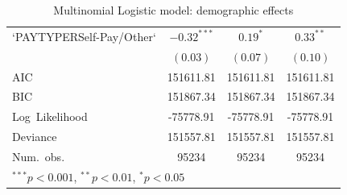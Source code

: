 \documentclass[12pt,twoside]{reedthesis}
\begin{document}
\begin{table}
\begin{center}
\begin{footnotesize}
\begin{tabular}{l c c c }
  `PAYTYPERSelf-Pay/Other` & $\mathbf{-0.32}^{***}$ & $0.19^{*}$             & $0.33^{**}$            \\
                           & $(0.03)$               & $(0.07)$               & $(0.10)$               \\
  \hline
  AIC                      & 151611.81              & 151611.81              & 151611.81              \\
  BIC                      & 151867.34              & 151867.34              & 151867.34              \\
  Log\ Likelihood          & -75778.91              & -75778.91              & -75778.91              \\
  Deviance                 & 151557.81              & 151557.81              & 151557.81              \\
  Num.\ obs.               & 95234                  & 95234                  & 95234                  \\
  \hline
  \multicolumn{4}{l}{\tiny{$^{***}p<0.001$, $^{**}p<0.01$, $^*p<0.05$}}
  \end{tabular}
  \end{footnotesize}
  \caption{Multinomial Logistic model: demographic effects}
  \label{table:coefficients}
  \end{center}
  \end{table}
  
\end{document}
